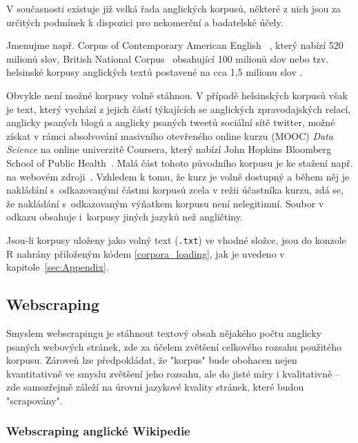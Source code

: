 V současnosti existuje již velká řada anglických korpusů,
některé z nich
jsou za určitých podmínek k dispozici pro nekomerční a badatelské účely.

Jmenujme např. Corpus of Contemporary American English~\cite{Davies2010}%
,
který nabízí 520 milionů slov,
British National Corpus~\cite{Landow1993}
obsahující 100 milionů slov
nebo tzv. helsinské korpusy anglických textů
postavené na cca 1,5 milionu
slov \cite{Kytoo1996}.

Obvykle není možné korpusy volně stáhnou. V případě helsinských korpusů%
však je text, který vychází z jejich částí týkajících se anglických
zpravodajských relací, anglicky psaných blogů a anglicky psaných tweetů
sociální sítě \textsf{twitter}, možné získat v rámci absolvování masivního
otevřeného online kurzu (MOOC) \textit{Data Science} na online univerzitě
Coursera\textsuperscript{\textregistered}, který nabízí John Hopkins Bloomberg
School of Public Health~\cite{DataScience}. Malá část tohoto původního korpusu je ke stažení např.
na webovém zdroji~\cite{CorpusLink}. Vzhledem k tomu, že kurz je volně dostupný
a během něj je nakládání s~odkazovanými částmi korpusů zcela v režii účastníka
kurzu, zdá se, že nakládání s~odkazovaným výňatkem korpusu není nelegitimní.
Soubor v odkazu obsahuje i~korpusy jiných jazyků než angličtiny.

Jsou-li korpusy uloženy jako volný text (\texttt{.txt}) ve vhodné složce,
jsou do konzole \textsf{R} nahrány přiloženým
kódem \ref{corpora_loading}, jak je uvedeno v kapitole~\ref{sec:Appendix}.


\subsection{Webscraping}

Smyslem webscrapingu je stáhnout textový obsah nějakého
počtu anglicky psaných
webových stránek, zde za účelem zvětšení celkového rozsahu použitého korpusu.
Zároveň lze předpokládat, že "korpus" bude obohacen nejen kvantitativně ve
smyslu zvětšení jeho rozsahu, ale do jisté míry i kvalitativně -- zde
samozřejmě záleží na úrovni jazykové kvality stránek, které budou
"scrapovány".


\subsubsection{Webscraping anglické Wikipedie}

